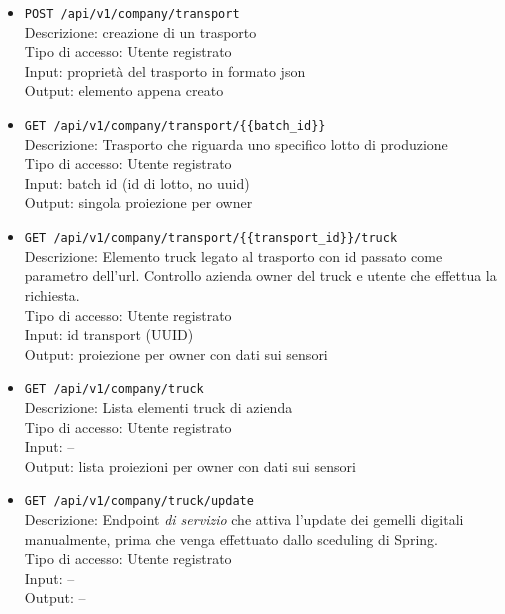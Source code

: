 \documentclass[a4paper,11pt]{article}
\begin{document}
\begin{itemize}
  \item \texttt{POST /api/v1/company/transport}
        \\ Descrizione: creazione di un trasporto
        \\ Tipo di accesso: Utente registrato
        \\ Input: proprietà del trasporto in formato json
        \\ Output: elemento appena creato

  \item \texttt{GET /api/v1/company/transport/\{\{batch\_id\}\}}
        \\ Descrizione: Trasporto che riguarda uno specifico lotto di produzione
        \\ Tipo di accesso: Utente registrato
        \\ Input: batch id (id di lotto, no uuid)
        \\ Output: singola proiezione per owner

  \item \texttt{GET /api/v1/company/transport/\{\{transport\_id\}\}/truck}
        \\ Descrizione: Elemento truck legato al trasporto con id passato come parametro dell'url. Controllo azienda owner del truck e utente che effettua la richiesta.
        \\ Tipo di accesso: Utente registrato
        \\ Input: id transport (UUID)
        \\ Output: proiezione per owner con dati sui sensori

  \item \texttt{GET /api/v1/company/truck}
        \\ Descrizione: Lista elementi truck di azienda
        \\ Tipo di accesso: Utente registrato
        \\ Input: --
        \\ Output: lista proiezioni per owner con dati sui sensori

  \item \texttt{GET /api/v1/company/truck/update}
        \\ Descrizione: Endpoint \textit{di servizio} che attiva l'update dei gemelli digitali manualmente, prima che venga effettuato dallo sceduling di Spring.
        \\ Tipo di accesso: Utente registrato
        \\ Input: --
        \\ Output: --


\end{itemize}
\end{document}
